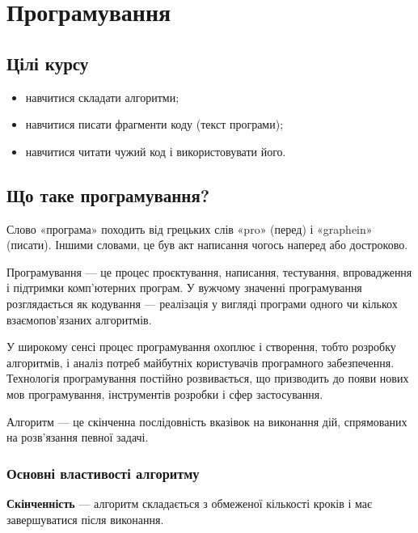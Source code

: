 \chapter{Програмування}

\section{Цілі курсу}
\begin{itemize}
	\item навчитися складати алгоритми;
	\item навчитися писати фрагменти коду (текст програми);
	\item навчитися читати чужий код і використовувати його.
\end{itemize}

\section{Що таке програмування?}


Слово «програма» походить від грецьких слів «pro» (перед) і «graphein» (писати). Іншими словами, це був акт написання чогось наперед або достроково.

\begin{defn}{Програмування — це}
	процес проєктування, написання, тестування, впровадження і підтримки комп’ютерних програм. У вужчому значенні програмування розглядається як кодування — реалізація у вигляді програми одного чи кількох взаємопов’язаних алгоритмів.
\end{defn}

У широкому сенсі процес програмування охоплює і створення, тобто розробку алгоритмів, і аналіз потреб майбутніх користувачів програмного забезпечення. Технологія програмування постійно розвивається, що призводить до появи нових мов програмування, інструментів розробки і сфер застосування.

\begin{defn}{Алгоритм — це}
	скінченна послідовність вказівок на виконання дій, спрямованих на розв’язання певної задачі.
\end{defn}
\subsection*{Основні властивості алгоритму}

\noindent \textbf{Скінченність} — алгоритм складається з обмеженої кількості кроків і має завершуватися після виконання.

